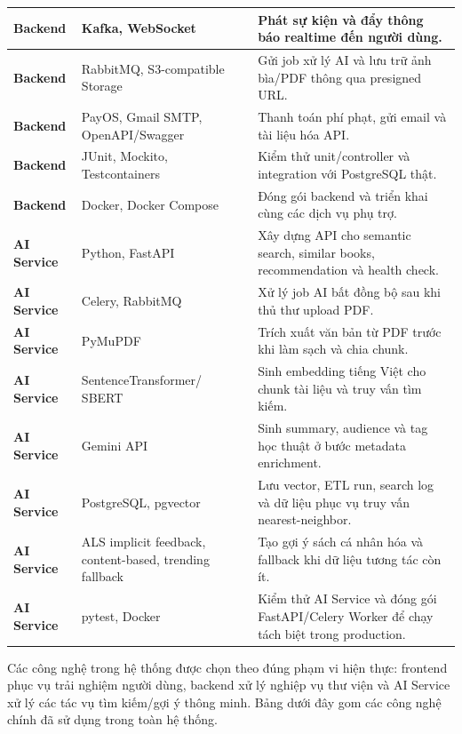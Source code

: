 \begin{xltabular}{\linewidth}{|p{2.2cm}|p{4.1cm}|X|}
\textbf{Backend} &
Kafka, WebSocket &
Phát sự kiện và đẩy thông báo realtime đến người dùng. \\
\hline

\textbf{Backend} &
RabbitMQ, S3-compatible Storage &
Gửi job xử lý AI và lưu trữ ảnh bìa/PDF thông qua presigned URL. \\
\hline

\textbf{Backend} &
PayOS, Gmail SMTP, OpenAPI/Swagger &
Thanh toán phí phạt, gửi email và tài liệu hóa API. \\
\hline

\textbf{Backend} &
JUnit, Mockito, Testcontainers &
Kiểm thử unit/controller và integration với PostgreSQL thật. \\
\hline

\textbf{Backend} &
Docker, Docker Compose &
Đóng gói backend và triển khai cùng các dịch vụ phụ trợ. \\
\hline

\textbf{AI Service} &
Python, FastAPI &
Xây dựng API cho semantic search, similar books, recommendation và health check. \\
\hline

\textbf{AI Service} &
Celery, RabbitMQ &
Xử lý job AI bất đồng bộ sau khi thủ thư upload PDF. \\
\hline

\textbf{AI Service} &
PyMuPDF &
Trích xuất văn bản từ PDF trước khi làm sạch và chia chunk. \\
\hline

\textbf{AI Service} &
SentenceTransformer\allowbreak/ SBERT &
Sinh embedding tiếng Việt cho chunk tài liệu và truy vấn tìm kiếm. \\
\hline

\textbf{AI Service} &
Gemini API &
Sinh summary, audience và tag học thuật ở bước metadata enrichment. \\
\hline

\textbf{AI Service} &
PostgreSQL, pgvector &
Lưu vector, ETL run, search log và dữ liệu phục vụ truy vấn nearest-neighbor. \\
\hline

\textbf{AI Service} &
ALS implicit feedback, content-based, trending fallback &
Tạo gợi ý sách cá nhân hóa và fallback khi dữ liệu tương tác còn ít. \\
\hline

\textbf{AI Service} &
pytest, Docker &
Kiểm thử AI Service và đóng gói FastAPI/Celery Worker để chạy tách biệt trong production. \\
\hline

\end{xltabular}
\endgroup
Các công nghệ trong hệ thống được chọn theo đúng phạm vi hiện thực: frontend
phục vụ trải nghiệm người dùng, backend xử lý nghiệp vụ thư viện và AI Service
xử lý các tác vụ tìm kiếm/gợi ý thông minh. Bảng dưới đây gom các công nghệ
chính đã sử dụng trong toàn hệ thống.

